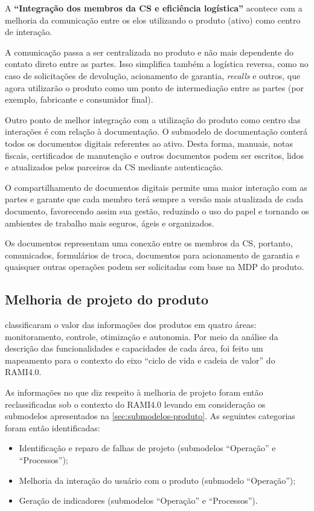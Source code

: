 A \textbf{``Integração dos membros da CS e eficiência logística''} acontece com a melhoria da comunicação entre os elos utilizando o produto (ativo) como centro de interação.

A comunicação passa a ser centralizada no produto e não mais dependente do contato direto entre as partes. Isso simplifica também a logística reversa, como no caso de solicitações de devolução, acionamento de garantia, \textit{recalls} e outros, que agora utilizarão o produto como um ponto de intermediação entre as partes (por exemplo, fabricante e consumidor final).

Outro ponto de melhor integração com a utilização do produto como centro das interações é com relação à documentação. O submodelo de documentação conterá todos os documentos digitais referentes ao ativo. Desta forma, manuais, notas fiscais, certificados de manutenção e outros documentos podem ser escritos, lidos e atualizados pelos parceiros da CS mediante autenticação.

O compartilhamento de documentos digitais permite uma maior interação com as partes e garante que cada membro terá sempre a versão mais atualizada de cada documento, favorecendo assim sua gestão, reduzindo o uso do papel e tornando os ambientes de trabalho mais seguros, ágeis e organizados.

Os documentos representam uma conexão entre os membros da CS, portanto, comunicados, formulários de troca, documentos para acionamento de garantia e quaisquer outras operações podem ser solicitadas com base na MDP do produto.

\subsection{Melhoria de projeto do produto}
\label{sub:melhoria-projeto}

 classificaram o valor das informações dos produtos em quatro áreas: monitoramento, controle, otimização e autonomia. Por meio da análise da descrição das funcionalidades e capacidades de cada área, foi feito um mapeamento para o contexto do eixo ``ciclo de vida e cadeia de valor'' do RAMI4.0.

As informações no que diz respeito à melhoria de projeto foram então reclassificadas sob o contexto do RAMI4.0 levando em consideração os submodelos apresentados na \autoref{sec:submodelos-produto}. As seguintes categorias foram então identificadas:

\begin{itemize}
	\item Identificação e reparo de falhas de projeto (submodelos ``Operação'' e ``Processos'');
	\item Melhoria da interação do usuário com o produto (submodelo ``Operação'');
	\item Geração de indicadores (submodelos ``Operação'' e ``Processos'').
\end{itemize}

